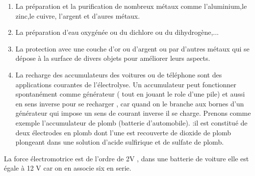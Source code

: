 \documentclass[12pt]{article}
\begin{document}
\begin{enumerate}
	\item La préparation et la purification de nombreux métaux comme l'aluminium,le zinc,le cuivre, l'argent et d'aures métaux.
	\item La préparation d'eau oxygénée ou du dichlore ou du dihydrogène,...
\item La protection avec une couche d’or ou d’argent ou par d’autres métaux qui se dépose à la surface de divers objets pour
améliorer leurs aspects.
\item La recharge des accumulateurs des voitures ou de téléphone sont des applications courantes de l'électrolyse.
Un accumulateur peut fonctionner spontanément comme générateur ( tout en jouant le role d'une pile) et aussi en sens inverse
pour se recharger , car quand on le branche aux bornes d'un générateur qui impose un sens de courant inverse il se charge.
Prenons comme exemple l'accumulateur de plomb (batterie d’automobile). :il est constitué de deux électrodes en plomb dont
l'une est recouverte de dioxide de plomb plongeant dans une solution d'acide sulfirique et de sulfate de plomb.



\end{enumerate}
La force électromotrice est de l'ordre de 2V , dans une batterie de voiture elle est égale à 12 V car on en associe six en serie.














\end{document}

